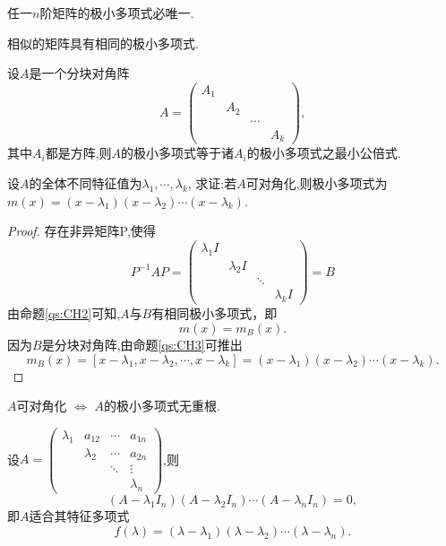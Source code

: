 \begin{question}\label{qs:CH1}
  任一$n$阶矩阵的极小多项式必唯一.
\end{question}
\begin{question}\label{qs:CH2}
  相似的矩阵具有相同的极小多项式.
\end{question}
\begin{question}\label{qs:CH3}
  设$A$是一个分块对角阵
  \[A=
    \begin{pmatrix}
      A_1 &&&\\
          &A_2&&\\
          &&\cdots&\\
      &&&A_k
    \end{pmatrix},\]
  其中$A_i$都是方阵,则$A$的极小多项式等于诸$A_i$的极小多项式之最小公倍式.
\end{question}
\begin{example}\label{exl:CH1}
  设$A$的全体不同特征值为$\lambda_1,\cdots,\lambda_k$,
  求证:若$A$可对角化,则极小多项式为
  $m(x)=(x-\lambda_1)(x-\lambda_2)\cdots(x-\lambda_k)$.
\end{example}
\begin{proof}
  存在非异矩阵P,使得
  \[P^{-1}AP=
    \begin{pmatrix}
      \lambda_1 I & & &\\
                  & \lambda_2 I & &\\
                  && \ddots &\\
      &&&\lambda_k I
    \end{pmatrix}=B\]
  由命题\ref{qs:CH2}可知,$A$与$B$有相同极小多项式，即
  \[m(x)=m_B(x).\]
  因为$B$是分块对角阵,由命题\ref{qs:CH3}可推出
  \[m_B(x)=[x-\lambda_1,x-\lambda_2,\cdots,x-\lambda_k]=
    (x-\lambda_1)(x-\lambda_2)\cdots(x-\lambda_k).\]
\end{proof}
\begin{notice}
  $A$可对角化 $\Longleftrightarrow$ $A$的极小多项式无重根.
\end{notice}
\begin{question}\label{qs:CH4}
  设$A=
  \begin{pmatrix}
    \lambda_1 & a_{12} & \cdots & a_{1n}\\
           & \lambda_2 & \cdots & a_{2n}\\
              && \ddots & \vdots\\
    &&&\lambda_n
  \end{pmatrix}$,则
  \begin{equation}
    \label{eq:CH4}
    (A-\lambda_1I_n)(A-\lambda_2I_n)\cdots(A-\lambda_nI_n)=0,
  \end{equation}
  即$A$适合其特征多项式
  \begin{equation}
    \label{eq:ch2}
    f(\lambda)=(\lambda-\lambda_1)(\lambda-\lambda_2)\cdots(\lambda-\lambda_n).
  \end{equation}
\end{question}
